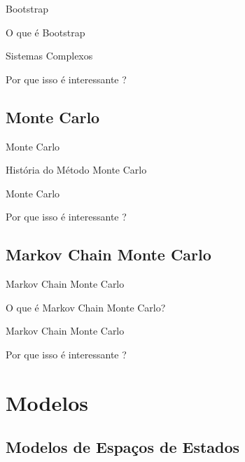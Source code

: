 \documentclass{beamer}
\begin{document}
\begin{frame}{Bootstrap}

O que é Bootstrap

\end{frame}


\begin{frame}{Sistemas Complexos}

Por que isso é interessante ?

\end{frame}


\subsection{Monte Carlo}

\begin{frame}{Monte Carlo}

História do Método Monte Carlo

\end{frame}


\begin{frame}{Monte Carlo}

Por que isso é interessante ?

\end{frame}

\subsection{Markov Chain Monte Carlo}

\begin{frame}{Markov Chain Monte Carlo}

O que é Markov Chain Monte Carlo?

\end{frame}


\begin{frame}{Markov Chain Monte Carlo}

Por que isso é interessante ?

\end{frame}




\section{Modelos}



\subsection{Modelos de Espaços de Estados}
\end{document}
